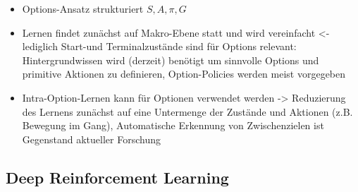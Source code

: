 \documentclass[paper=a4, fontsize=11pt]{scrartcl} %
\numberwithin{equation}{section} %
\numberwithin{figure}{section} %
\numberwithin{table}{section} %
\begin{document}
\begin{itemize}
\begin{itemize}
\item Options-Ansatz strukturiert $S,A,\pi,G$
\item Lernen findet zunächst auf Makro-Ebene statt und wird vereinfacht <- lediglich Start-und Terminalzustände sind für Options relevant: Hintergrundwissen wird (derzeit) benötigt um sinnvolle Options und primitive Aktionen zu definieren, Option-Policies werden meist vorgegeben
\item Intra-Option-Lernen kann für Optionen verwendet werden -> Reduzierung des Lernens zunächst auf eine Untermenge der Zustände und Aktionen (z.B. Bewegung im Gang), Automatische Erkennung von Zwischenzielen ist Gegenstand aktueller Forschung
\end{itemize}
\end{itemize}

\subsection{Deep Reinforcement Learning}
\end{document}
